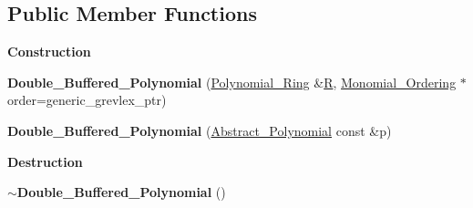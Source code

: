 \subsection*{Public Member Functions}
\begin{Indent}\textbf{ Construction}\par
\begin{DoxyCompactItemize}
\item 
\mbox{\label{class_double___buffered___polynomial_ab663800f31484a5d55ec9363e7669f56}} 
{\bfseries Double\+\_\+\+Buffered\+\_\+\+Polynomial} (\hyperlink{class_polynomial___ring}{Polynomial\+\_\+\+Ring} \&\hyperlink{class_abstract___polynomial_a551ade20b7dcd96c227dd0401f6ffbbe}{R}, \hyperlink{class_monomial___ordering}{Monomial\+\_\+\+Ordering} $\ast$order=generic\+\_\+grevlex\+\_\+ptr)
\item 
\mbox{\label{class_double___buffered___polynomial_ace854a5e7d0fac35ad2d9469a34656a7}} 
{\bfseries Double\+\_\+\+Buffered\+\_\+\+Polynomial} (\hyperlink{class_abstract___polynomial}{Abstract\+\_\+\+Polynomial} const \&p)
\end{DoxyCompactItemize}
\end{Indent}
\begin{Indent}\textbf{ Destruction}\par
\begin{DoxyCompactItemize}
\item 
\mbox{\label{class_double___buffered___polynomial_a61b7620ea7b3b7ba3db0b96065458166}} 
{\bfseries $\sim$\+Double\+\_\+\+Buffered\+\_\+\+Polynomial} ()
\end{DoxyCompactItemize}
\end{Indent}
